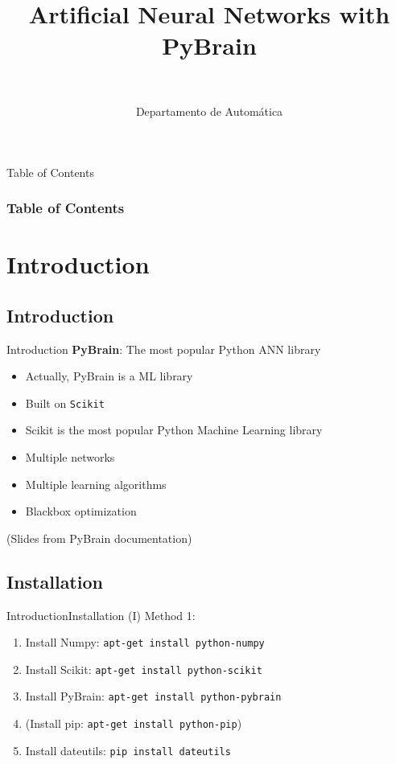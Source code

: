 \documentclass[10pt,compress]{beamer} %
\title[Aritificial Neural Networks with PyBrain]{Artificial Neural Networks with PyBrain}
\author{\asignatura\\\carrera}
\institute{}
\date{Departamento de Automática}
\begin{document}
{\titlepageBlue
    \begin{frame}
        \titlepage
    \end{frame}
}

\institute{\asignatura}

{
\begin{frame}[shrink]{Table of Contents}
 \frametitle{Table of Contents}
 \tableofcontents
\end{frame}
}

\section{Introduction}
\subsection{Introduction}

\begin{frame}{Introduction}
	\textbf{PyBrain}: The most popular Python ANN library
	\begin{itemize}
		\item Actually, PyBrain is a ML library
		\item Built on \texttt{Scikit}
		\item Scikit is the most popular Python Machine Learning library
		\item Multiple networks
		\item Multiple learning algorithms
		\item Blackbox optimization
	\end{itemize}
	\small (Slides from PyBrain documentation)
\end{frame}

\subsection{Installation}
\begin{frame}{Introduction}{Installation (I)}
	Method 1:
	\begin{enumerate}
		\item Install Numpy: \texttt{apt-get install python-numpy}
		\item Install Scikit: \texttt{apt-get install python-scikit}
		\item Install PyBrain: \texttt{apt-get install python-pybrain}
		\item (Install pip: \texttt{apt-get install python-pip})
		\item Install dateutils: \texttt{pip install dateutils}
	\end{enumerate}

\end{frame}
\end{document}
